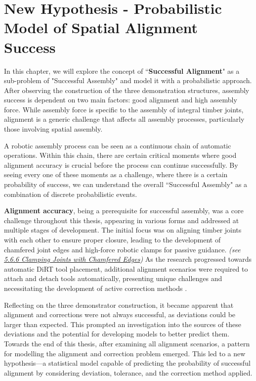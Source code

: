 \chapter{New Hypothesis - Probabilistic Model of Spatial Alignment Success}
\label{chapter:new-hypothesis}

In this chapter, we will explore the concept of ``\textbf{Successful Alignment}" as a sub-problem of "Successful Assembly" and model it with a probabilistic approach. After observing the construction of the three demonstration structures, assembly success is dependent on two main factors: good alignment and high assembly force. While assembly force is specific to the assembly of integral timber joints, alignment is a generic challenge that affects all assembly processes, particularly those involving spatial assembly.

A robotic assembly process can be seen as a continuous chain of automatic operations. Within this chain, there are certain critical moments where good alignment accuracy is crucial before the process can continue successfully. By seeing every one of these moments as a challenge, where there is a certain probability of success, we can understand the overall ``Successful Assembly" as a combination of discrete probabilistic events.

\textbf{Alignment accuracy}, being a prerequisite for successful assembly, was a core challenge throughout this thesis, appearing in various forms and addressed at multiple stages of development. The initial focus was on aligning timber joints with each other to ensure proper closure, leading to the development of chamfered joint edges and high-force robotic clamps for passive guidance. \textit{(see \ul{5.6.6 Clamping Joints with Chamfered Edges})} As the research progressed towards automatic DiRT tool placement, additional alignment scenarios were required to attach and detach tools automatically, presenting unique challenges and necessitating the development of active correction methods .

Reflecting on the three demonstrator construction, it became apparent that alignment and corrections were not always successful, as deviations could be larger than expected. This prompted an investigation into the sources of these deviations and the potential for developing models to better predict them. Towards the end of this thesis, after examining all alignment scenarios, a pattern for modelling the alignment and correction problem emerged. This led to a new hypothesis—a statistical model capable of predicting the probability of successful alignment by considering deviation, tolerance, and the correction method applied.


